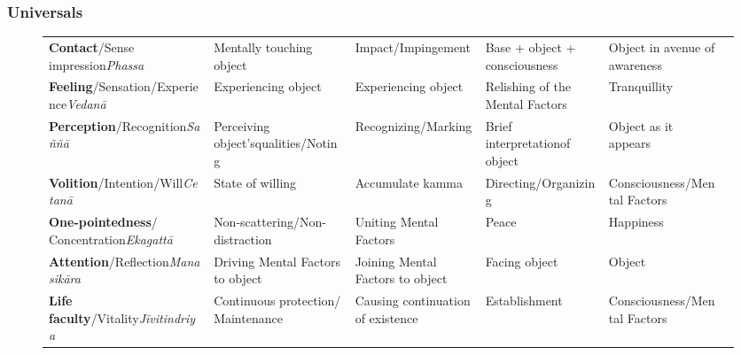 \subsubsection*{Universals}

\begin{figure} [H]

\setlength{\tabcolsep}{0pt}
\renewcommand{\arraystretch}{1.1}

\noindent\begin{tabular}{P{0.25\textwidth} | C{.185\textwidth} C{0.185\textwidth} C{0.185\textwidth} C{0.195\textwidth} m{0mm}}
\toprule
 &  &  &  & \\
\midrule
\textbf{Contact}/\newline Sense impression\newline \textit{Phassa} & Mentally touching object & Impact/\newline Impingement & Base + object + consciousness & Object in avenue of awareness &\\[12mm]
\textbf{Feeling}/\newline Sensation/Experience\newline \textit{Vedanā} & Experiencing object & Experiencing object & Relishing of the Mental Factors & Tranquillity &\\[12mm]
\textbf{Perception}/\newline Recognition\newline \textit{Saññā} & Perceiving object’s\newline qualities/Noting & Recognizing/\newline Marking & Brief interpretation\newline of object & Object as it appears &\\[12mm]
\textbf{Volition}/\newline Intention/Will\newline \textit{Cetanā} & State of willing & Accumulate kamma & Directing/\newline Organizing & Consciousness/\newline Mental Factors &\\[12mm]
\textbf{One-pointedness}/ Concentration\newline \textit{Ekagattā} & Non-scattering/\newline Non-distraction & Uniting Mental Factors & Peace & Happiness &\\[12mm]
\textbf{Attention}/\newline Reflection\newline \textit{Manasikāra} & Driving Mental Factors to object & Joining Mental Factors to object & Facing object & Object &\\[12mm]
\textbf{Life faculty}/\newline Vitality\newline \textit{Jīvitindriya} & Continuous protection/ Maintenance & Causing continuation of existence & Establishment & Consciousness/\newline Mental Factors &\\[12mm]
\bottomrule
\end{tabular} 


\end{figure}
